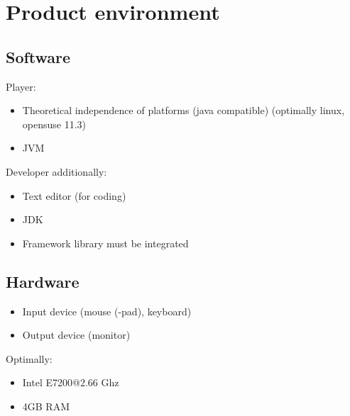 \section{Product environment}

\subsection{Software}
Player:
\begin{itemize}
\item Theoretical independence of platforms (\Gls{java} compatible) (optimally \gls{linux}, \gls{opensuse} 11.3)
\item \Gls{JVM}
\end{itemize}
Developer additionally:
\begin{itemize}
\item Text editor (for coding)
\item \Gls{JDK}
\item Framework library must be integrated
\end{itemize}

\subsection{Hardware}
\begin{itemize}
\item Input device (mouse (-pad), keyboard)
\item Output device (monitor)
\end{itemize}
Optimally:
\begin{itemize}
\item Intel E7200@2.66 Ghz
\item 4GB RAM
\end{itemize}